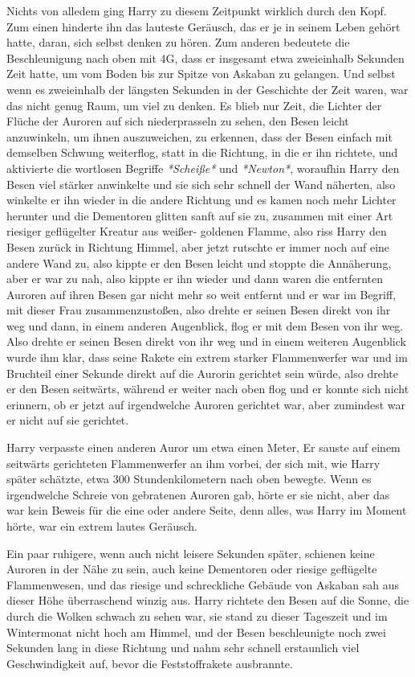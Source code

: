 {Nichts von alledem ging Harry zu diesem Zeitpunkt wirklich durch den Kopf. Zum einen hinderte ihn das lauteste Geräusch, das er je in seinem Leben gehört hatte, daran, sich selbst denken zu hören. Zum anderen bedeutete die Beschleunigung nach oben mit 4G, dass er insgesamt etwa zweieinhalb Sekunden Zeit hatte, um vom Boden bis zur Spitze von Askaban zu gelangen. Und selbst wenn es zweieinhalb der längsten Sekunden in der Geschichte der Zeit waren, war das nicht genug Raum, um viel zu denken. Es blieb nur Zeit, die Lichter der Flüche der Auroren auf sich niederprasseln zu sehen, den Besen leicht anzuwinkeln, um ihnen auszuweichen, zu erkennen, dass der Besen einfach mit demselben Schwung weiterflog, statt in die Richtung, in die er ihn richtete, und aktivierte die wortlosen Begriffe \emph{*Scheiße*} und \emph{*Newton*}, woraufhin Harry den Besen viel stärker anwinkelte und sie sich sehr schnell der Wand näherten, also winkelte er ihn wieder in die andere Richtung und es kamen noch mehr Lichter herunter und die Dementoren glitten sanft auf sie zu, zusammen mit einer Art riesiger geflügelter Kreatur aus weißer- goldenen Flamme, also riss Harry den Besen zurück in Richtung Himmel, aber jetzt rutschte er immer noch auf eine andere Wand zu, also kippte er den Besen leicht und stoppte die Annäherung, aber er war zu nah, also kippte er ihn wieder und dann waren die entfernten Auroren auf ihren Besen gar nicht mehr so weit entfernt und er war im Begriff, mit dieser Frau zusammenzustoßen, also drehte er seinen Besen direkt von ihr weg und dann, in einem anderen Augenblick, flog er mit dem Besen von ihr weg. Also drehte er seinen Besen direkt von ihr weg und in einem weiteren Augenblick wurde ihm klar, dass seine Rakete ein extrem starker Flammenwerfer war und im Bruchteil einer Sekunde direkt auf die Aurorin gerichtet sein würde, also drehte er den Besen seitwärts, während er weiter nach oben flog und er konnte sich nicht erinnern, ob er jetzt auf irgendwelche Auroren gerichtet war, aber zumindest war er nicht auf sie gerichtet.

Harry verpasste einen anderen Auror um etwa einen Meter, Er sauste auf einem seitwärts gerichteten Flammenwerfer an ihm vorbei, der sich mit, wie Harry später schätzte, etwa 300 Stundenkilometern nach oben bewegte. Wenn es irgendwelche Schreie von gebratenen Auroren gab, hörte er sie nicht, aber das war kein Beweis für die eine oder andere Seite, denn alles, was Harry im Moment hörte, war ein extrem lautes Geräusch.

Ein paar ruhigere, wenn auch nicht leisere Sekunden später, schienen keine Auroren in der Nähe zu sein, auch keine Dementoren oder riesige geflügelte Flammenwesen, und das riesige und schreckliche Gebäude von Askaban sah aus dieser Höhe überraschend winzig aus. Harry richtete den Besen auf die Sonne, die durch die Wolken schwach zu sehen war, sie stand zu dieser Tageszeit und im Wintermonat nicht hoch am Himmel, und der Besen beschleunigte noch zwei Sekunden lang in diese Richtung und nahm sehr schnell erstaunlich viel Geschwindigkeit auf, bevor die Feststoffrakete ausbrannte.

}
